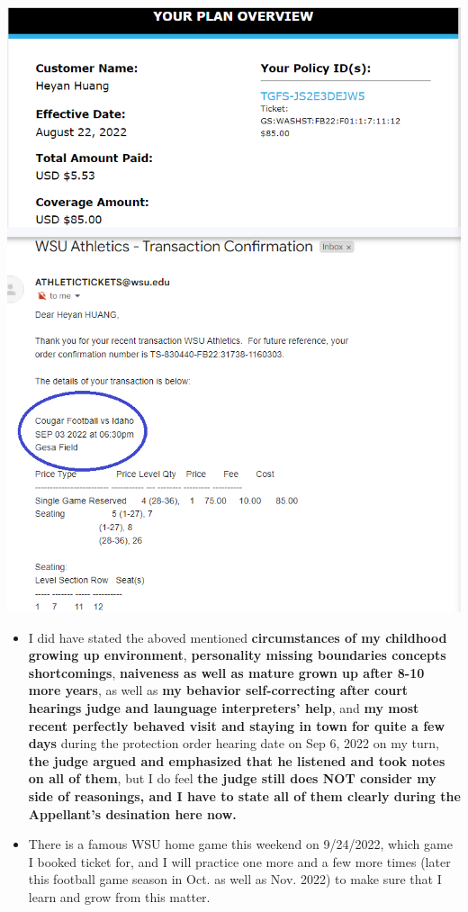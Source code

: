 \documentclass[9pt, b5paper]{article}
\begin{document}
\includegraphics[width=.9\linewidth]{./pic/dearCousin_20220919_225307.png}
\begin{itemize}
\item I did have stated the aboved mentioned \textbf{circumstances of my childhood growing up environment}, \textbf{personality missing boundaries concepts shortcomings}, \textbf{naiveness as well as mature grown up after 8-10 more years}, as well as \textbf{my behavior self-correcting after court hearings judge and launguage interpreters' help}, and \textbf{my most recent perfectly behaved visit and staying in town for quite a few days} during the protection order hearing date on Sep 6, 2022 on my turn, \textbf{the judge argued and emphasized that he listened and took notes on all of them}, but I do feel \textbf{the judge still does NOT consider my side of reasonings, and I have to state all of them clearly during the Appellant's desination here now.}
\item There is a famous WSU home game this weekend on 9/24/2022, which game I booked ticket for, and I will practice one more and a few more times (later this football game season in Oct. as well as Nov. 2022) to make sure that I learn and grow from this matter.
\end{itemize}
\end{document}
